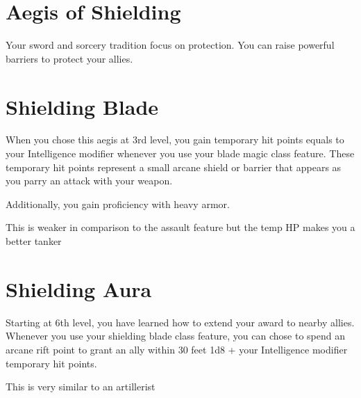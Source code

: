 \clearpage

\begin{multicols*}{2}
 
\section*{Aegis of Shielding}

Your sword and sorcery tradition focus on protection. You can raise powerful barriers to protect your allies.

\section*{Shielding Blade}

When you chose this aegis at 3rd level, you gain temporary hit points equals to your Intelligence modifier whenever you use your blade magic class feature.
These temporary hit points represent a small arcane shield or barrier that appears as you parry an attack with your weapon.

Additionally, you gain proficiency with heavy armor.

\smallskip

{\color{red} This is weaker in comparison to the assault feature but the temp HP makes you a better tanker }


\section*{Shielding Aura}

Starting at 6th level, you have learned how to extend your award to nearby allies. Whenever you use your shielding blade class feature, you can chose to spend an arcane rift point to grant an ally within 30 feet 1d8 + your Intelligence modifier temporary hit points.

\smallskip

{\color{red} This is very similar to an artillerist }



\end{multicols*}
